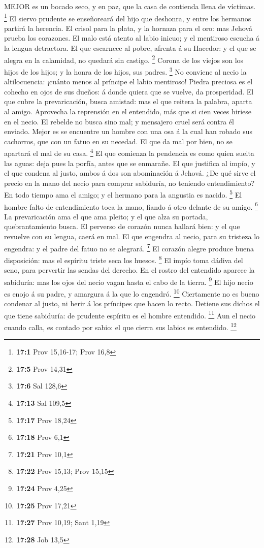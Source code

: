  MEJOR es un bocado seco, y en paz, que la casa de contienda
llena de víctimas. \footnote{\textbf{17:1} Prov 15,16-17; Prov 16,8}
 El siervo prudente se enseñoreará del hijo que deshonra, y
entre los hermanos partirá la herencia.  El crisol para la
plata, y la hornaza para el oro: mas Jehová prueba los corazones.
 El malo está atento al labio inicuo; y el mentiroso escucha
á la lengua detractora.  El que escarnece al pobre, afrenta
á su Hacedor: y el que se alegra en la calamidad, no quedará sin
castigo. \footnote{\textbf{17:5} Prov 14,31}  Corona de los
viejos son los hijos de los hijos; y la honra de los hijos, sus padres.
\footnote{\textbf{17:6} Sal 128,6}  No conviene al necio la
altilocuencia: ¡cuánto menos al príncipe el labio mentiroso!
 Piedra preciosa es el cohecho en ojos de sus dueños: á
donde quiera que se vuelve, da prosperidad.  El que cubre la
prevaricación, busca amistad: mas el que reitera la palabra, aparta al
amigo.  Aprovecha la reprensión en el entendido, más que si
cien veces hiriese en el necio.  El rebelde no busca sino
mal; y mensajero cruel será contra él enviado.  Mejor es se
encuentre un hombre con una osa á la cual han robado sus cachorros, que
con un fatuo en su necedad.  El que da mal por bien, no se
apartará el mal de su casa. \footnote{\textbf{17:13} Sal 109,5}
 El que comienza la pendencia es como quien suelta las
aguas: deja pues la porfía, antes que se enmarañe.  El que
justifica al impío, y el que condena al justo, ambos á dos son
abominación á Jehová.  ¿De qué sirve el precio en la mano
del necio para comprar sabiduría, no teniendo entendimiento?
 En todo tiempo ama el amigo; y el hermano para la angustia
es nacido. \footnote{\textbf{17:17} Prov 18,24}  El hombre
falto de entendimiento toca la mano, fiando á otro delante de su amigo.
\footnote{\textbf{17:18} Prov 6,1}  La prevaricación ama el
que ama pleito; y el que alza su portada, quebrantamiento busca.
 El perverso de corazón nunca hallará bien: y el que
revuelve con su lengua, caerá en mal.  El que engendra al
necio, para su tristeza lo engendra: y el padre del fatuo no se
alegrará. \footnote{\textbf{17:21} Prov 10,1}  El corazón
alegre produce buena disposición: mas el espíritu triste seca los
huesos. \footnote{\textbf{17:22} Prov 15,13; Prov 15,15} 
El impío toma dádiva del seno, para pervertir las sendas del derecho.
 En el rostro del entendido aparece la sabiduría: mas los
ojos del necio vagan hasta el cabo de la tierra. \footnote{\textbf{17:24}
  Prov 4,25}  El hijo necio es enojo á su padre, y amargura
á la que lo engendró. \footnote{\textbf{17:25} Prov 17,21} 
Ciertamente no es bueno condenar al justo, ni herir á los príncipes que
hacen lo recto.  Detiene sus dichos el que tiene sabiduría:
de prudente espíritu es el hombre entendido. \footnote{\textbf{17:27}
  Prov 10,19; Sant 1,19}  Aun el necio cuando calla, es
contado por sabio: el que cierra sus labios es entendido. \footnote{\textbf{17:28}
  Job 13,5}

